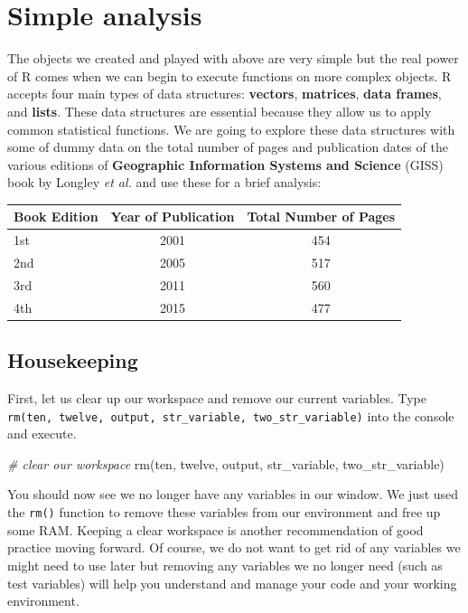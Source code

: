 \documentclass[
]{book}
\newenvironment{Shaded}{\begin{snugshade}}{\end{snugshade}}
\newcommand{\CommentTok}[1]{\textcolor[rgb]{0.56,0.35,0.01}{\textit{#1}}}
\newcommand{\FunctionTok}[1]{\textcolor[rgb]{0.00,0.00,0.00}{#1}}
\newcommand{\NormalTok}[1]{#1}
\begin{document}
\hypertarget{simple-analysis}{%
\section{Simple analysis}\label{simple-analysis}}

The objects we created and played with above are very simple but the real power of R comes when we can begin to execute functions on more complex objects. R accepts four main types of data structures: \textbf{vectors}, \textbf{matrices}, \textbf{data frames}, and \textbf{lists}. These data structures are essential because they allow us to apply common statistical functions.
We are going to explore these data structures with some of dummy data on the total number of pages and publication dates of the various editions of \textbf{Geographic Information Systems and Science} (GISS) book by Longley \emph{et al.} and use these for a brief analysis:

\begin{longtable}[]{@{}lcc@{}}
\toprule()
Book Edition & Year of Publication & Total Number of Pages \\
\midrule()
\endhead
1st & 2001 & 454 \\
2nd & 2005 & 517 \\
3rd & 2011 & 560 \\
4th & 2015 & 477 \\
\bottomrule()
\end{longtable}

\hypertarget{housekeeping}{%
\subsection{Housekeeping}\label{housekeeping}}

First, let us clear up our workspace and remove our current variables. Type \texttt{rm(ten,\ twelve,\ output,\ str\_variable,\ two\_str\_variable)} into the console and execute.

\begin{Shaded}
\begin{Highlighting}[]
\CommentTok{\# clear our workspace}
\FunctionTok{rm}\NormalTok{(ten, twelve, output, str\_variable, two\_str\_variable)}
\end{Highlighting}
\end{Shaded}

You should now see we no longer have any variables in our window. We just used the \texttt{rm()} function to remove these variables from our environment and free up some RAM. Keeping a clear workspace is another recommendation of good practice moving forward. Of course, we do not want to get rid of any variables we might need to use later but removing any variables we no longer need (such as test variables) will help you understand and manage your code and your working environment.
\end{document}
